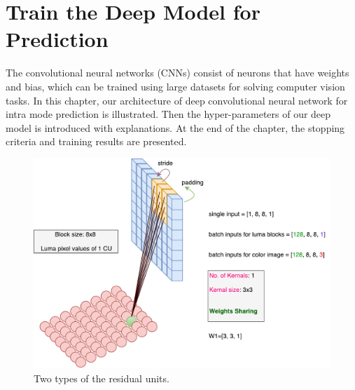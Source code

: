 \chapter{Train the Deep Model for Prediction}\label{ch:chapter4} %
%
The convolutional neural networks (CNNs) consist of neurons that have 
weights and bias, which can be trained using large datasets for solving 
computer vision tasks.
In this chapter, our architecture of
deep convolutional neural network for intra mode prediction 
is illustrated.
Then the hyper-parameters of our deep model is introduced
with explanations.
At the end of the chapter, the stopping criteria and training results 
are presented.
\begin{figure}
    \centering
    \includegraphics[width=\textwidth,height=\textheight,keepaspectratio]{Figures/cnn_illustration.pdf}
    \caption[Two types of the residual units]{
        Two types of the residual units.}\label{fig:cnn-illustration}
\end{figure}


